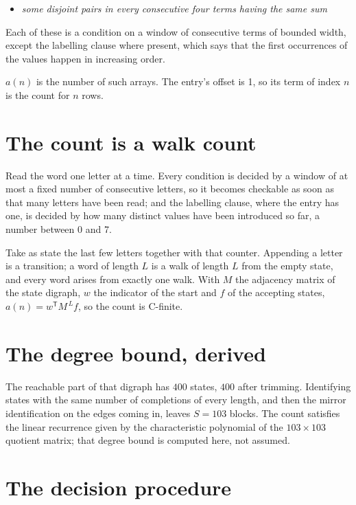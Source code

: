 \documentclass[11pt]{article}
\theoremstyle{definition}
\begin{document}
\begin{itemize}

\item {\itshape some disjoint pairs in every consecutive four terms having the same sum}

\end{itemize}

Each of these is a condition on a window of consecutive terms of bounded width, except the labelling clause where present, which says that the first occurrences of the values happen in increasing order.

$a(n)$ is the number of such arrays. The entry's offset is 1, so its term of index $n$ is the count for $n$ rows.

\section{The count is a walk count}

Read the word one letter at a time. Every condition is decided by a window of at most a fixed number of consecutive letters, so it becomes checkable as soon as that many letters have been read; and the labelling clause, where the entry has one, is decided by how many distinct values have been introduced so far, a number between $0$ and 7.

Take as state the last few letters together with that counter. Appending a letter is a transition; a word of length $L$ is a walk of length $L$ from the empty state, and every word arises from exactly one walk. With $M$ the adjacency matrix of the state digraph, $w$ the indicator of the start and $f$ of the accepting states, $a(n) = w^{\mathsf T}M^{\,L}f$, so the count is C-finite.

\section{The degree bound, derived}

The reachable part of that digraph has $400$ states, $400$ after trimming. Identifying states with the same number of completions of every length, and then the mirror identification on the edges coming in, leaves $S = 103$ blocks. The count satisfies the linear recurrence given by the characteristic polynomial of the $103\times103$ quotient matrix; that degree bound is computed here, not assumed.

\section{The decision procedure}
\end{document}
